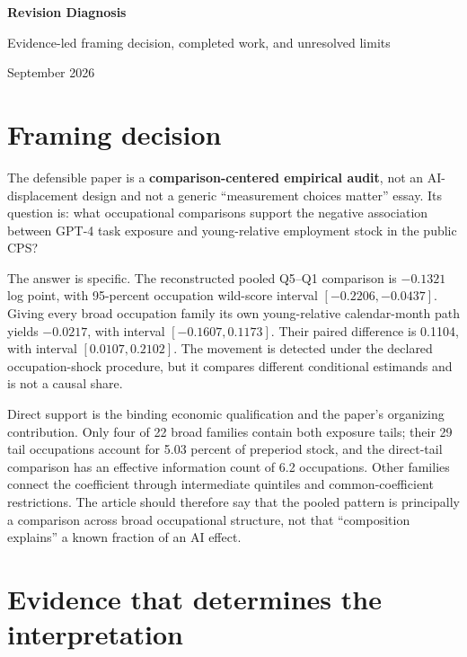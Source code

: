 \documentclass[11pt,letterpaper]{article}
\begin{document}
\begin{center}
{\Large\bfseries Revision Diagnosis}\par
\vspace{0.3em}
Evidence-led framing decision, completed work, and unresolved limits\par
September 2026
\end{center}

\section*{Framing decision}

The defensible paper is a \textbf{comparison-centered empirical audit}, not an AI-displacement design and not a generic ``measurement choices matter'' essay.  Its question is: what occupational comparisons support the negative association between GPT-4 task exposure and young-relative employment stock in the public CPS?

The answer is specific.  The reconstructed pooled Q5--Q1 comparison is $-0.1321$ log point, with 95-percent occupation wild-score interval $[-0.2206,-0.0437]$.  Giving every broad occupation family its own young-relative calendar-month path yields $-0.0217$, with interval $[-0.1607,0.1173]$.  Their paired difference is 0.1104, with interval $[0.0107,0.2102]$.  The movement is detected under the declared occupation-shock procedure, but it compares different conditional estimands and is not a causal share.

Direct support is the binding economic qualification and the paper's organizing contribution.  Only four of 22 broad families contain both exposure tails; their 29 tail occupations account for 5.03 percent of preperiod stock, and the direct-tail comparison has an effective information count of 6.2 occupations.  Other families connect the coefficient through intermediate quintiles and common-coefficient restrictions.  The article should therefore say that the pooled pattern is principally a comparison across broad occupational structure, not that ``composition explains'' a known fraction of an AI effect.

\section*{Evidence that determines the interpretation}
\end{document}
